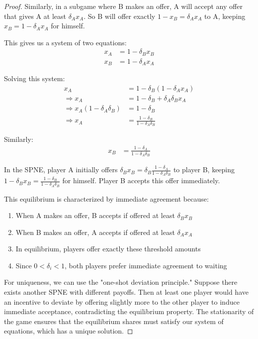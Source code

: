 \documentclass[12pt]{article}
\begin{document}
\begin{enumerate}
\begin{proof}
Similarly, in a subgame where B makes an offer, A will accept any offer that gives A at least $\delta_A x_A$. So B will offer exactly $1-x_B = \delta_A x_A$ to A, keeping $x_B = 1-\delta_A x_A$ for himself.

This gives us a system of two equations:
\begin{align}
x_A &= 1-\delta_B x_B\\
x_B &= 1-\delta_A x_A
\end{align}

Solving this system:
\begin{align}
x_A &= 1-\delta_B(1-\delta_A x_A)\\
\Rightarrow x_A &= 1-\delta_B+\delta_A\delta_B x_A\\
\Rightarrow x_A(1-\delta_A\delta_B) &= 1-\delta_B\\
\Rightarrow x_A &= \frac{1-\delta_B}{1-\delta_A\delta_B}
\end{align}

Similarly:
\begin{align}
x_B &= \frac{1-\delta_A}{1-\delta_A\delta_B}
\end{align}

In the SPNE, player A initially offers $\delta_B x_B = \delta_B\frac{1-\delta_A}{1-\delta_A\delta_B}$ to player B, keeping $1-\delta_B x_B = \frac{1-\delta_B}{1-\delta_A\delta_B}$ for himself. Player B accepts this offer immediately.

This equilibrium is characterized by immediate agreement because:
\begin{enumerate}
    \item When A makes an offer, B accepts if offered at least $\delta_B x_B$
    \item When B makes an offer, A accepts if offered at least $\delta_A x_A$
    \item In equilibrium, players offer exactly these threshold amounts
    \item Since $0 < \delta_i < 1$, both players prefer immediate agreement to waiting
\end{enumerate}

For uniqueness, we can use the "one-shot deviation principle." Suppose there exists another SPNE with different payoffs. Then at least one player would have an incentive to deviate by offering slightly more to the other player to induce immediate acceptance, contradicting the equilibrium property. The stationarity of the game ensures that the equilibrium shares must satisfy our system of equations, which has a unique solution.
\end{proof}



\end{enumerate}
\end{document}
